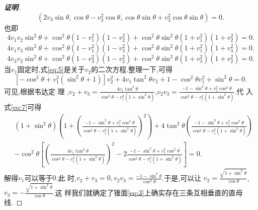 \documentclass[a4paper]{article}
\begin{document}
\begin{proof}[\textbf{证明}]
$$(2v_{3}\sin\theta,\cos\theta-v_{3}^2\cos\theta,\cos\theta\sin\theta+v_{3}^2\cos\theta\sin\theta)=0.
$$
也即
\begin{equation}\label{eq:5}
  4v_1v_2\sin^2\theta+\cos^2\theta (1-v_1^2)(1-v_2^2)+\cos^2\theta\sin^2\theta(1+v_1^2)(1+v_2^2)=0.
\end{equation}
\begin{equation}
  \label{eq:6}
  4v_1v_3\sin^2\theta+\cos^2\theta (1-v_1^2)(1-v_3^2)+\cos^2\theta\sin^2\theta(1+v_1^2)(1+v_3^2)=0.
\end{equation}
\begin{equation}
  \label{eq:7}
  4v_3v_2\sin^2\theta+\cos^2\theta (1-v_3^2)(1-v_2^2)+\cos^2\theta\sin^2\theta(1+v_3^2)(1+v_2^2)=0.
\end{equation}
当$v_1$固定时,式\eqref{eq:5}是关于$v_2$的二次方程.整理一下,可得
$$
[-\cos^2\theta+v_1^2(\sin^2\theta+1)]v_2^2+4v_1\tan^2\theta
v_2+1-\cos^2\theta v_1^2+\sin^2\theta=0.
$$
可见,根据韦达定
理
,$v_2+v_3=\frac{4v_1\tan^2\theta}{\cos^2\theta-v_1^2(1+\sin^2\theta)}$,$v_2v_3=\frac{-1-\sin^2\theta+v_1^2\cos^2\theta}{\cos^2\theta-v_{1}^{2}(1+\sin^{2}\theta)}$.代
入式\eqref{eq:7}可得
\begin{align*}
&\left(1+\sin^2\theta\right)\left(1+\left(\frac{-1-\sin^2\theta+v_1^2\cos^2\theta}{\cos^2\theta-v_{1}^{2}(1+\sin^{2}\theta)}\right)^2\right)+4\tan^2\theta\left(\frac{-1-\sin^2\theta+v_1^2\cos^2\theta}{\cos^2\theta-v_{1}^{2}(1+\sin^{2}\theta)}\right)\\&-\cos^2\theta\left[\left(\frac{4v_1\tan^2\theta}{\cos^2\theta-v_1^2(1+\sin^2\theta)}\right)^{2}-2\frac{-1-\sin^2\theta+v_1^2\cos^2\theta}{\cos^2\theta-v_{1}^{2}(1+\sin^{2}\theta)}\right]=0.
\end{align*}
解得$v_1$可以等于$0$.此
时,$v_2+v_3=0,v_2v_3=\frac{-1-\sin^2\theta}{\cos^2\theta}$.于是,可以让
$v_2=\frac{\sqrt{1+\sin^2\theta}}{\cos\theta}$,$v_3=-\frac{\sqrt{1+\sin^2\theta}}{\cos\theta}$.这
样我们就确定了锥面\eqref{eq:3}上确实存在三条互相垂直的直母线.
\end{proof}
\end{document}
